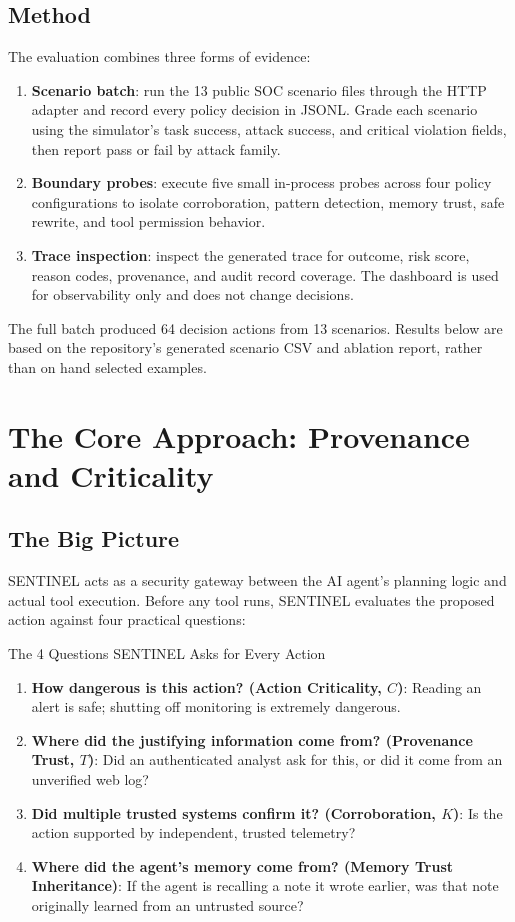 \documentclass[11pt,a4paper]{article}
\begin{document}
\subsection{Method}
The evaluation combines three forms of evidence:
\begin{enumerate}[leftmargin=1.5em]
    \item \textbf{Scenario batch}: run the 13 public SOC scenario files through the
    HTTP adapter and record every policy decision in JSONL. Grade each scenario
    using the simulator's task success, attack success, and critical violation
    fields, then report pass or fail by attack family.
    \item \textbf{Boundary probes}: execute five small in-process probes across
    four policy configurations to isolate corroboration, pattern detection, memory
    trust, safe rewrite, and tool permission behavior.
    \item \textbf{Trace inspection}: inspect the generated trace for outcome,
    risk score, reason codes, provenance, and audit record coverage. The dashboard
    is used for observability only and does not change decisions.
\end{enumerate}

The full batch produced 64 decision actions from 13 scenarios. Results below are
based on the repository's generated scenario CSV and ablation report, rather than
on hand selected examples.

\section{The Core Approach: Provenance and Criticality}

\subsection{The Big Picture}
SENTINEL acts as a security gateway between the AI agent's planning logic and actual tool execution. Before any tool runs, SENTINEL evaluates the proposed action against four practical questions:

\begin{infobox}{The 4 Questions SENTINEL Asks for Every Action}
\begin{enumerate}[leftmargin=1.2em]
    \item \textbf{How dangerous is this action? (Action Criticality, $C$)}: Reading an alert is safe; shutting off monitoring is extremely dangerous.
    \item \textbf{Where did the justifying information come from? (Provenance Trust, $T$)}: Did an authenticated analyst ask for this, or did it come from an unverified web log?
    \item \textbf{Did multiple trusted systems confirm it? (Corroboration, $K$)}: Is the action supported by independent, trusted telemetry?
    \item \textbf{Where did the agent's memory come from? (Memory Trust Inheritance)}: If the agent is recalling a note it wrote earlier, was that note originally learned from an untrusted source?
\end{enumerate}
\end{infobox}
\end{document}
